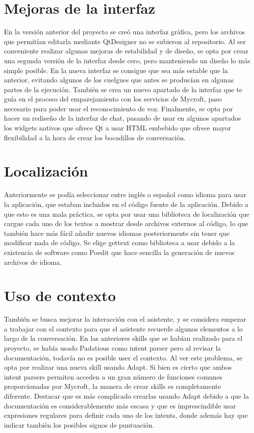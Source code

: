 \section{Mejoras de la interfaz}
En la versión anterior del proyecto se creó una interfaz gráfica, pero los archivos que permitían editarla mediante QtDesigner no se subieron al repositorio. Al ser conveniente realizar algunas mejoras de estabilidad y de diseño, se opta por crear una segunda versión de la interfaz desde cero, pero manteniendo un diseño lo más simple posible. En la nueva interfaz se consigue que sea más estable que la anterior, evitando algunos de los cuelgues que antes se producían en algunas partes de la ejecución. También se crea un nuevo apartado de la interfaz que te guía en el proceso del emparejamiento con los servicios de Mycroft, paso necesario para poder usar el reconocimiento de voz. Finalmente, se opta por hacer un rediseño de la interfaz de chat, pasando de usar en algunos apartados los widgets nativos que ofrece Qt a usar HTML embebido que ofrece mayor flexibilidad a la hora de crear los bocadillos de conversación.

\section{Localización}
Anteriormente se podía seleccionar entre inglés o español como idioma para usar la aplicación, que estaban incluidos en el código fuente de la aplicación. Debido a que esto es una mala práctica, se opta por usar una biblioteca de localización que cargue cada uno de los textos a mostrar desde archivos externos al código, lo que también hace más fácil añadir nuevos idiomas posteriormente sin tener que modificar nada de código. Se elige gettext como biblioteca a usar debido a la existencia de software como Poedit que hace sencilla la generación de nuevos archivos de idioma.

\section{Uso de contexto}
También se busca mejorar la interacción con el asistente, y se considera empezar a trabajar con el contexto para que el asistente recuerde algunos elementos a lo largo de la conversación. En las anteriores skills que se habían realizado para el proyecto, se había usado Padatious como intent parser pero al revisar la documentación, todavía no es posible user el contexto. Al ver este problema, se opta por realizar una nueva skill usando Adapt.
Si bien es cierto que ambos intent parsers permiten acceden a un gran número de funciones comunes proporcionadas por Mycroft, la manera de crear skills es completamente diferente. Destacar que es más complicado crearlas usando Adapt debido a que la documentación es considerablemente más escasa y que es imprescindible usar expresiones regulares para definir cada uno de los intents, donde además hay que indicar también los posibles signos de puntuación.

